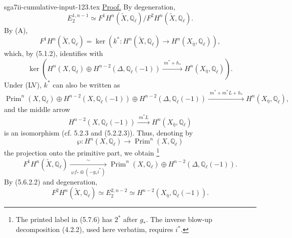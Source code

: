 \begin{filecontents*}{sga7ii-cumulative-input-123.tex}
\underline{Proof.}
By degeneration,
\[
E_2^{1,n-1}\simeq
F^1H^n(\widetilde X,\mathbb Q_\ell)
\big/F^2H^n(\widetilde X,\mathbb Q_\ell).
\]
By (A),
\begin{equation}\tag{5.7.2}
F^1H^n(\widetilde X,\mathbb Q_\ell)
=\ker\!\left(
k^*:H^n(\widetilde X,\mathbb Q_\ell)\longrightarrow
H^n(X_{\bar\eta},\mathbb Q_\ell)
\right),
\end{equation}
which, by (5.1.2), identifies with
\[
\ker\!\left(
H^n(X,\mathbb Q_\ell)
\oplus H^{n-2}(\Delta,\mathbb Q_\ell(-1))
\xrightarrow{\;m^*+h_*\;}
H^n(X_{\bar\eta},\mathbb Q_\ell)
\right).
\]
Under (LV), $k^*$ can also be written as
\begin{equation}\tag{5.7.3}
\operatorname{Prim}^n(X,\mathbb Q_\ell)
\oplus H^{n-2}(X,\mathbb Q_\ell(-1))
\oplus H^{n-2}(\Delta,\mathbb Q_\ell(-1))
\xrightarrow{\;m^*+m^*L+h_*\;}
H^n(X_{\bar\eta},\mathbb Q_\ell),
\end{equation}
and the middle arrow
\begin{equation}\tag{5.7.4}
H^{n-2}(X,\mathbb Q_\ell(-1))
\xrightarrow{\;m^*L\;}
H^n(X_{\bar\eta},\mathbb Q_\ell)
\end{equation}
is an isomorphism (cf. 5.2.3 and (5.2.2.3)).  Thus, denoting by
\begin{equation}\tag{5.7.5}
\wp:H^n(X,\mathbb Q_\ell)\longrightarrow
\operatorname{Prim}^n(X,\mathbb Q_\ell)
\end{equation}
the projection onto the primitive part, we obtain
\footnote{The printed label in (5.7.6) has $2^*$ after $g_*$.
The inverse blow-up decomposition (4.2.2), used here verbatim, requires
$i^*$.}
\begin{equation}\tag{5.7.6}
F^1H^n(\widetilde X,\mathbb Q_\ell)
\xrightarrow[\;\wp f_*\oplus(-g_*i^*)\;]{\sim}
\operatorname{Prim}^n(X,\mathbb Q_\ell)
\oplus H^{n-2}(\Delta,\mathbb Q_\ell(-1)).
\end{equation}
By (5.6.2.2) and degeneration,
\begin{equation}\tag{5.7.7}
F^2H^n(\widetilde X,\mathbb Q_\ell)
\simeq E_2^{2,n-2}
\simeq H^{n-2}(X_{\bar\eta},\mathbb Q_\ell(-1)).
\end{equation}


\end{filecontents*}
